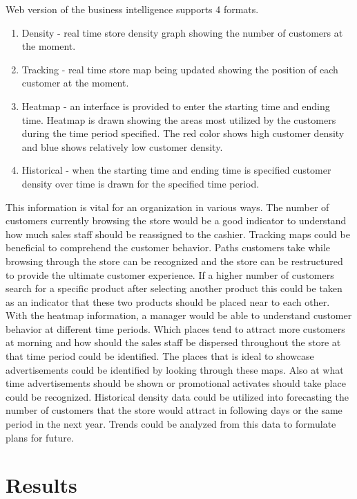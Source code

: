 \documentclass[12pt,a4paper]{report}
\begin{document}
Web version of the business intelligence supports 4 formats.
\begin{enumerate}

\item Density - real time store density graph showing the number of customers at the moment.
\item Tracking - real time store map being updated showing the position of each customer at the moment.

\item Heatmap - an interface is provided to enter the starting time and ending time. Heatmap is drawn showing the areas most utilized by the customers during the time period specified. The red color shows high customer density and blue shows relatively low customer density.

\item Historical - when the starting time and ending time is specified customer density over time is drawn for the specified time period. 

\end{enumerate}

This information is vital for an organization in various ways. The number of customers currently browsing the store would be a good indicator to understand how much sales staff should be reassigned to the cashier. Tracking maps could be beneficial to comprehend the customer behavior. Paths customers take while browsing through the store can be recognized and the store can be restructured to provide the ultimate customer experience. If a higher number of customers search for a specific product after selecting another product this could be taken as an indicator that these two products should be placed near to each other. With the heatmap information, a manager would be able to understand customer behavior at different time periods. Which places tend to attract more customers at morning and how should the sales staff be dispersed throughout the store at that time period could be identified. The places that is ideal to showcase advertisements could be identified by looking through these maps. Also at what time advertisements should be shown or promotional activates should take place could be recognized. Historical density data could be utilized into forecasting the number of customers that the store would attract in following days or the same period in the next year. Trends could be analyzed from this data to formulate plans for future. 

\chapter{Results}
\end{document}
